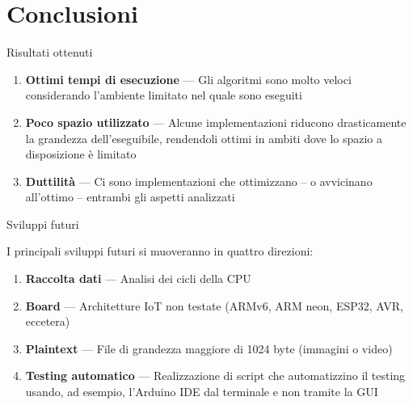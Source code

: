 \section{Conclusioni}


\begin{frame}{Risultati ottenuti}

\begin{enumerate}[<+->]
    \item \textbf{Ottimi tempi di esecuzione} --- Gli algoritmi sono molto veloci considerando l'ambiente limitato nel quale sono eseguiti
    \item \textbf{Poco spazio utilizzato} --- Alcune implementazioni riducono drasticamente la grandezza dell'eseguibile, rendendoli ottimi in ambiti dove lo spazio a disposizione è limitato
    \item \textbf{Duttilità} --- Ci sono implementazioni che ottimizzano -- o avvicinano all'ottimo -- entrambi gli aspetti analizzati
\end{enumerate}

\end{frame}


\begin{frame}{Sviluppi futuri}

I principali sviluppi futuri si muoveranno in quattro direzioni:
\begin{enumerate}[<+->]
    \item \textbf{Raccolta dati} --- Analisi dei cicli della CPU
    \item \textbf{Board} --- Architetture IoT non testate (ARMv6, ARM neon, ESP32, AVR, eccetera)
    \item \textbf{Plaintext} --- File di grandezza maggiore di 1024 byte (immagini o video)
    \item \textbf{Testing automatico} --- Realizzazione di script che automatizzino il testing usando, ad esempio, l'Arduino IDE dal terminale e non tramite la GUI
\end{enumerate}

\end{frame}
